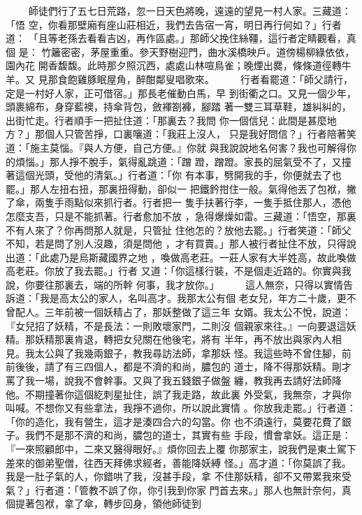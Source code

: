 \begin{pinyinscope}
{　　
師徒們行了五七日荒路，忽一日天色將晚，遠遠的望見一村人家。三藏道：「悟
空，你看那壁廂有座山莊相近，我們去告宿一宵，明日再行何如？」行者道：
「且等老孫去看看吉凶，再作區處。」那師父挽住絲韁，這行者定睛觀看，真個
是：
竹籬密密，茅屋重重。參天野樹迎門，曲水溪橋映戶。道傍楊柳綠依依，園內花
開香馥馥。此時那夕照沉西，處處山林喧鳥雀；晚煙出爨，條條道徑轉牛羊。又
見那食飽雞豚眠屋角，醉酣鄰叟唱歌來。
　　
行者看罷道：「師父請行，定是一村好人家，正可借宿。」那長老催動白馬，早
到街衢之口。又見一個少年，頭裹綿布，身穿藍襖，持傘背包，斂褌劄褲，腳踏
著一雙三耳草鞋，雄糾糾的，出街忙走。行者順手一把扯住道：「那裏去？我問
你一個信兒：此間是甚麼地方？」那個人只管苦掙，口裏嚷道：「我莊上沒人，
只是我好問信？」行者陪著笑道：「施主莫惱。『與人方便，自己方便。』你就
與我說說地名何害？我也可解得你的煩惱。」那人掙不脫手，氣得亂跳道：「蹭
蹬，蹭蹬。家長的屈氣受不了，又撞著這個光頭，受他的清氣。」行者道：「你
有本事，劈開我的手，你便就去了也罷。」那人左扭右扭，那裏扭得動，卻似一
把鐵鈐拑住一般。氣得他丟了包袱，撇了傘，兩隻手雨點似來抓行者。行者把一
隻手扶著行李，一隻手抵住那人，憑他怎麼支吾，只是不能抓著。行者愈加不放
，急得爆燥如雷。三藏道：「悟空，那裏不有人來了？你再問那人就是，只管扯
住他怎的？放他去罷。」行者笑道：「師父不知，若是問了別人沒趣，須是問他
，才有買賣。」那人被行者扯住不放，只得說出道：「此處乃是烏斯藏國界之地
，喚做高老莊。一莊人家有大半姓高，故此喚做高老莊。你放了我去罷。」行者
又道：「你這樣行裝，不是個走近路的。你實與我說，你要往那裏去，端的所幹
何事，我才放你。」
　　
這人無奈，只得以實情告訴道：「我是高太公的家人，名叫高才。我那太公有個
老女兒，年方二十歲，更不曾配人。三年前被一個妖精占了，那妖整做了這三年
女婿。我太公不悅，說道：『女兒招了妖精，不是長法：一則敗壞家門，二則沒
個親家來往。』一向要退這妖精。那妖精那裏肯退，轉把女兒關在他後宅，將有
半年，再不放出與家內人相見。我太公與了我幾兩銀子，教我尋訪法師，拿那妖
怪。我這些時不曾住腳，前前後後，請了有三四個人，都是不濟的和尚，膿包的
道士，降不得那妖精。剛才罵了我一場，說我不會幹事。又與了我五錢銀子做盤
纏，教我再去請好法師降他。不期撞著你這個紇刺星扯住，誤了我走路，故此裏
外受氣，我無奈，才與你叫喊。不想你又有些拿法，我掙不過你，所以說此實情
。你放我走罷。」行者道：「你的造化，我有營生，這才是湊四合六的勾當。你
也不須遠行，莫要花費了銀子。我們不是那不濟的和尚，膿包的道士，其實有些
手段，慣會拿妖。這正是：『一來照顧郎中，二來又醫得眼好。』煩你回去上覆
你那家主，說我們是東土駕下差來的御弟聖僧，往西天拜佛求經者，善能降妖縛
怪。」高才道：「你莫誤了我。我是一肚子氣的人，你錯哄了我，沒甚手段，拿
不住那妖精，卻不又帶累我來受氣？」行者道：「管教不誤了你，你引我到你家
門首去來。」那人也無計奈何，真個提著包袱，拿了傘，轉步回身，領他師徒到
}
\end{pinyinscope}
